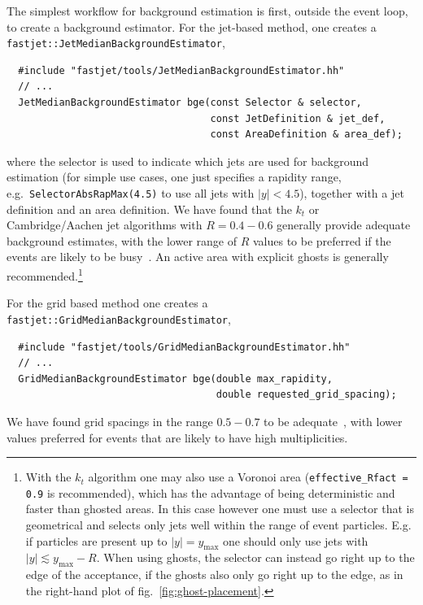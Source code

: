 \documentclass[12pt,a4]{article}
\newcommand{\ttt}[1]{{\small\texttt{#1}}}
\begin{document}
The simplest workflow for background estimation is first, outside the
event loop, to create a background estimator.
%
For the jet-based method, one creates a
\ttt{fastjet::JetMedianBackgroundEstimator},
\begin{lstlisting}
  #include "fastjet/tools/JetMedianBackgroundEstimator.hh"
  // ...
  JetMedianBackgroundEstimator bge(const Selector & selector,
                                   const JetDefinition & jet_def,
                                   const AreaDefinition & area_def);
\end{lstlisting}
where the selector is used to indicate which jets are used for
background estimation (for simple use cases, one just specifies a
rapidity range, e.g.\ \ttt{SelectorAbsRapMax(4.5)} to use all jets
with $|y|<4.5$), together with a jet definition  and an area
definition. 
%
We have found that the $k_t$ or Cambridge/Aachen jet algorithms with $R
= 0.4 - 0.6$ generally provide adequate background estimates, with
the lower range of $R$ values to be preferred if the events are likely
to be busy~\cite{Cacciari:2009dp,Soyez:2018opl}.
%
An active area with explicit ghosts is generally
recommended.\footnote{With the $k_t$ algorithm one may also use a
  Voronoi area (\texttt{effective\_Rfact = 0.9} is recommended), which
  has the advantage of being deterministic and faster than ghosted
  areas. In this case however one must use a selector that is
  geometrical and selects only jets well within the range of event
  particles. 
  E.g. if particles are present up to $|y| = y_{\max}$ one should only
  use jets with $|y| \lesssim y_{\max} - R$.
  When using ghosts, the selector can instead go right up
  to the edge of the acceptance, if the ghosts also only go right up
  to the edge, as in the right-hand plot of
  fig.~\ref{fig:ghost-placement}.}
%

For the grid based method one creates a
\ttt{fastjet::GridMedianBackgroundEstimator},
\begin{lstlisting}
  #include "fastjet/tools/GridMedianBackgroundEstimator.hh"
  // ...
  GridMedianBackgroundEstimator bge(double max_rapidity,
                                    double requested_grid_spacing);
\end{lstlisting}
We have found grid spacings in the range $0.5-0.7$ to be
adequate~\cite{Soyez:2018opl}, with lower values preferred for events
that are likely to have high multiplicities.
\end{document}
